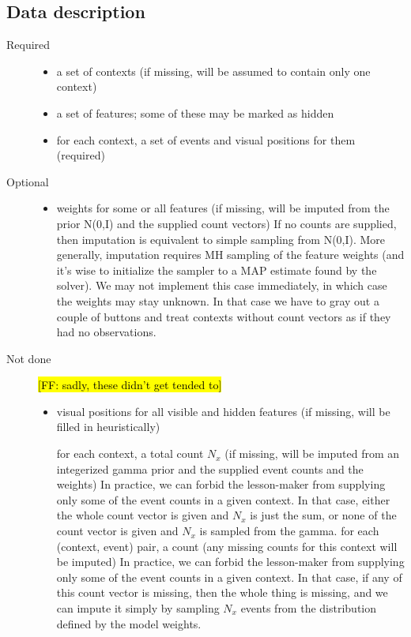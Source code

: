 \documentclass[11pt,letterpaper]{article}
\newcommand{\Note}[1]{}
\renewcommand{\Note}[1]{\hl{[#1]}}
\newcommand{\NoteSigned}[3]{{\sethlcolor{#2}\Note{#1: #3}}}
\newcommand{\NoteFF}[1]{\NoteSigned{FF}{LightBlue}{#1}}
\begin{document}
\subsection{Data description}
\begin{description}
\item[Required]

\begin{itemize}
\item a set of contexts (if missing, will be assumed to contain only one context)
\item a set of features; some of these may be marked as hidden
\item for each context, a set of events and visual positions for them (required)
\end{itemize}

\item[Optional]

\begin{itemize}
\item weights for some or all features (if missing, will be imputed from the prior N(0,I) and the supplied count vectors)
If no counts are supplied, then imputation is equivalent to simple sampling from N(0,I).
More generally, imputation requires MH sampling of the feature weights (and it’s wise to initialize the sampler to a MAP estimate found by the solver).  We may not implement this case immediately, in which case the weights may stay unknown.  In that case we have to gray out a couple of buttons and treat contexts without count vectors as if they had no observations.
\end{itemize}

\item[Not done] \NoteFF{sadly, these didn't get tended to}
\begin{itemize}
\item visual positions for all visible and hidden features (if missing, will be filled in heuristically)

for each context, a total count $N_x$ (if missing, will be imputed from an integerized gamma prior and the supplied event counts and the weights)
In practice, we can forbid the lesson-maker from supplying only some of the event counts in a given context.  In that case, either the whole count vector is given and $N_x$ is just the sum, or none of the count vector is given and $N_x$ is sampled from the gamma.
for each (context, event) pair, a count (any missing counts for this context will be imputed)
In practice, we can forbid the lesson-maker from supplying only some of the event counts in a given context.  In that case, if any of this count vector is missing, then the whole thing is missing, and we can impute it simply by sampling $N_x$ events from the distribution defined by the model weights.
\end{itemize}
\end{description}




\end{document}
